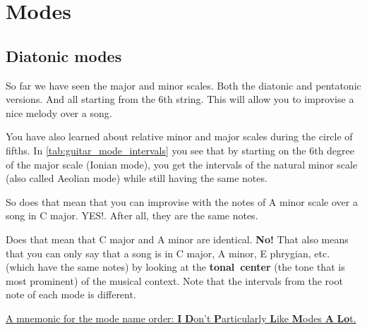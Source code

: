\section{Modes} \label{sec:modes}

\subsection{Diatonic modes}

So far we have seen the major and minor scales. Both the diatonic and pentatonic versions. And all starting from the 6th string. This will allow you to improvise a nice melody over a song.

You have also learned about relative minor and major scales during the circle of fifths. In \autoref{tab:guitar_mode_intervals} you see that by starting on the 6th degree of the major scale (Ionian mode), you get the intervals of the natural minor scale (also called \textnormal{A}eolian mode) while still having the same notes.

So d\textnormal{o}es that mean that you can improvise with the notes of A minor scale over a song in C major. YES!. After all, they are the same notes.

D\textnormal{o}es that mean that C major and A minor are identical. \textbf{No!} That also means that you can only say that a song is in C major, A minor, E phrygian, etc. (which have the same notes) by looking at the \mbox{\textbf{tonal center}} (the tone that is most prominent) of the musical context. Note that the intervals from the root note of each mode is different.

\underline{A mnemonic for the mode name order: \textbf{I} \textbf{D}on't \textbf{P}articularly \textbf{L}ike \textbf{M}odes \textbf{A} \textbf{Lo}t.}

